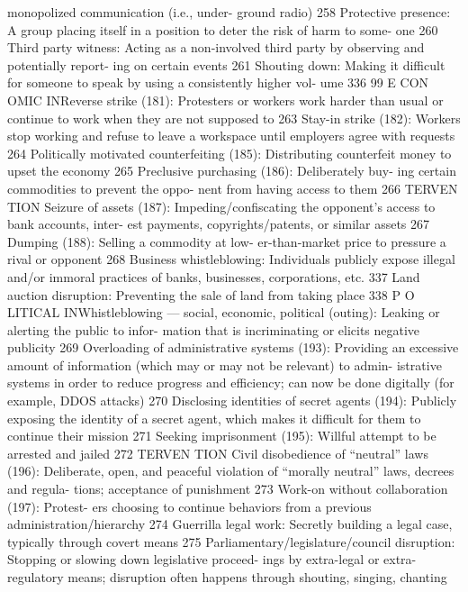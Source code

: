 \documentclass[twoside,a4paper,12pt,fleqn,openany]{extbook}
\begin{document}
monopolized communication (i.e., under-
ground radio)
 258
Protective presence: A group placing itself in
a position to deter the risk of harm to some-
one
 260
Third party witness: Acting as a non-involved
third party by observing and potentially report-
ing on certain events
 261
Shouting down: Making it difficult for someone
to speak by using a consistently higher vol-
ume
 336
99
E CON OMIC INReverse strike (181): Protesters or workers
work harder than usual or continue to work
when they are not supposed to
 263
Stay-in strike (182): Workers stop working and
refuse to leave a workspace until employers
agree with requests
 264
Politically motivated counterfeiting (185):
Distributing counterfeit money to upset the
economy
 265
Preclusive purchasing (186): Deliberately buy-
ing certain commodities to prevent the oppo-
nent from having access to them
 266
TERVEN TION
Seizure of assets (187): Impeding/confiscating
the opponent’s access to bank accounts, inter-
est payments, copyrights/patents, or similar
assets
 267
Dumping (188): Selling a commodity at low-
er-than-market price to pressure a rival or
opponent
 268
Business whistleblowing: Individuals publicly
expose illegal and/or immoral practices of
banks, businesses, corporations, etc.
 337
Land auction disruption: Preventing the sale
of land from taking place
 338
P O LITICAL INWhistleblowing — social, economic, political
(outing): Leaking or alerting the public to infor-
mation that is incriminating or elicits negative
publicity
 269
Overloading of administrative systems (193):
Providing an excessive amount of information
(which may or may not be relevant) to admin-
istrative systems in order to reduce progress
and efficiency; can now be done digitally (for
example, DDOS attacks)
 270
Disclosing identities of secret agents (194):
Publicly exposing the identity of a secret agent,
which makes it difficult for them to continue
their mission
 271
Seeking imprisonment (195): Willful attempt
to be arrested and jailed
 272
TERVEN TION
Civil disobedience of “neutral” laws (196):
Deliberate, open, and peaceful violation of
“morally neutral” laws, decrees and regula-
tions; acceptance of punishment
 273
Work-on without collaboration (197): Protest-
ers choosing to continue behaviors from a
previous administration/hierarchy
 274
Guerrilla legal work: Secretly building a legal
case, typically through covert means
 275
Parliamentary/legislature/council disruption:
Stopping or slowing down legislative proceed-
ings by extra-legal or extra-regulatory means;
disruption often happens through shouting,
singing, chanting
\end{document}
